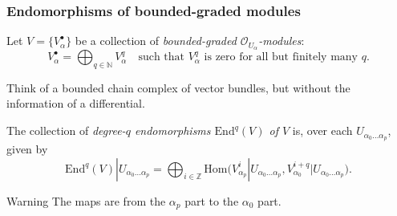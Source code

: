 \documentclass{beamer}
\begin{document}
            \begin{frame}\frametitle{Endomorphisms of bounded-graded modules}
                Let $V=\{V_\alpha^\bullet\}$ be a collection of \emph{bounded-graded $\mathcal{O}_{U_\alpha}$-modules}:
                \begin{equation*}
                    V_\alpha^\bullet = \bigoplus_{q\in\mathbb{N}}V_\alpha^q\quad\text{such that }V_\alpha^q\text{ is zero for all but finitely many }q.
                \end{equation*}

                \pause

                Think of a bounded chain complex of vector bundles, but without the information of a differential.

                \pause

                \begin{definition}[Endomorphisms]
                    The collection of \emph{degree-$q$ endomorphisms $\mathrm{End}^q(V)$ of $V$} is, over each $U_{\alpha_0\ldots\alpha_p}$, given by
                    \begin{equation*}
                        \mathrm{End}^q(V)|U_{\alpha_0\ldots\alpha_p} = \bigoplus_{i\in\mathbb{Z}}\mathrm{Hom}\big( V_{\alpha_p}^i|U_{\alpha_0\ldots\alpha_p}, V_{\alpha_0}^{i+q}|U_{\alpha_0\ldots\alpha_p} \big).
                    \end{equation*}
                \end{definition}

                \pause

                \begin{alertblock}{Warning}
                    The maps are from the $\alpha_p$ part to the $\alpha_0$ part.
                \end{alertblock}
            \end{frame}
\end{document}
